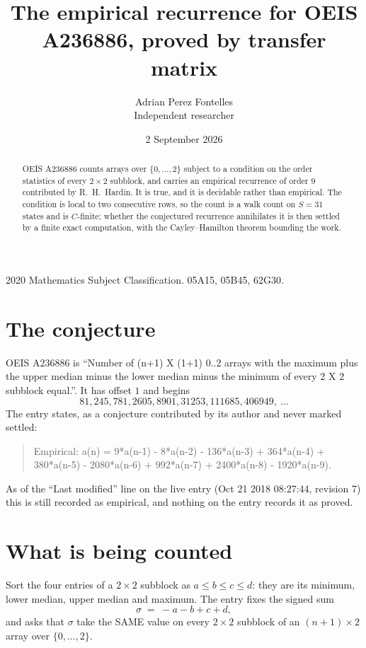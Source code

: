 \documentclass[11pt,a4paper]{article}
\title{The empirical recurrence for OEIS A236886, proved by transfer matrix}
\author{Adrian Perez Fontelles\\ \small Independent researcher}
\date{2 September 2026}
\theoremstyle{plain}
\theoremstyle{definition}
\begin{document}
\maketitle

\begin{abstract}
OEIS A236886 counts arrays over $\{0,\dots,2\}$ subject to a condition on the order
statistics of every $2\times2$ subblock, and carries an empirical recurrence of order
$9$ contributed by R.~H.~Hardin. It is true, and it is decidable rather than empirical.
The condition is local to two consecutive rows, so the count is a walk count on $S=31$
states and is $C$-finite; whether the conjectured recurrence annihilates it is then settled by
a finite exact computation, with the Cayley--Hamilton theorem bounding the work.
\end{abstract}

\noindent\small 2020 Mathematics Subject Classification. 05A15, 05B45, 62G30.\normalsize

\section{The conjecture}

OEIS A236886 is ``Number of (n+1) X (1+1) 0..2 arrays with the maximum plus the upper median minus the lower median minus the minimum of every 2 X 2 subblock equal.''. It has offset $1$ and begins
\[
81, 245, 781, 2605, 8901, 31253, 111685, 406949,\ \dots
\]
The entry states, as a conjecture contributed by its author and never marked settled:
\begin{quote}
Empirical: a(n) = 9*a(n-1) - 8*a(n-2) - 136*a(n-3) + 364*a(n-4) + 380*a(n-5) - 2080*a(n-6) + 992*a(n-7) + 2400*a(n-8) - 1920*a(n-9).
\end{quote}
As of the ``Last modified'' line on the live entry (Oct 21 2018 08:27:44, revision 7) this is still
recorded as empirical, and nothing on the entry records it as proved.

\section{What is being counted}

Sort the four entries of a $2\times2$ subblock as $a\le b\le c\le d$: they
are its minimum, lower median, upper median and maximum. The entry fixes the signed sum
\[
\sigma\;=\;-a-b+c+d,
\]
and asks that $\sigma$ take the SAME value on every $2\times2$ subblock of an
$(n+1)\times2$ array over $\{0,\dots,2\}$.
\end{document}

